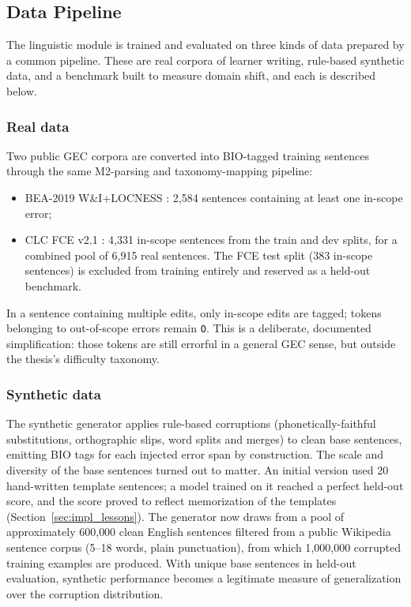 \subsection{Data Pipeline}
\label{sec:impl_ling_data}

The linguistic module is trained and evaluated on three kinds of data prepared by a common pipeline. These are real corpora of learner writing, rule-based synthetic data, and a benchmark built to measure domain shift, and each is described below.

\subsubsection{Real data}

Two public GEC corpora are converted into BIO-tagged training sentences through the same M2-parsing and taxonomy-mapping pipeline:

\begin{itemize}
    \item BEA-2019 W\&I+LOCNESS \parencite{Bryant2019}: 2{,}584 sentences containing at least one in-scope error;
    \item CLC FCE v2.1 \parencite{YannakoudakisBriscoeMedlock2011}: 4{,}331 in-scope sentences from the train and dev splits, for a combined pool of 6{,}915 real sentences. The FCE test split (383 in-scope sentences) is excluded from training entirely and reserved as a held-out benchmark.
\end{itemize}

In a sentence containing multiple edits, only in-scope edits are tagged; tokens belonging to out-of-scope errors remain \texttt{O}. This is a deliberate, documented simplification: those tokens are still errorful in a general GEC sense, but outside the thesis's difficulty taxonomy.

\subsubsection{Synthetic data}

The synthetic generator applies rule-based corruptions (phonetically-faithful substitutions, orthographic slips, word splits and merges) to clean base sentences, emitting BIO tags for each injected error span by construction. The scale and diversity of the base sentences turned out to matter. An initial version used 20 hand-written template sentences; a model trained on it reached a perfect held-out score, and the score proved to reflect memorization of the templates (Section~\ref{sec:impl_lessons}). The generator now draws from a pool of approximately 600{,}000 clean English sentences filtered from a public Wikipedia sentence corpus (5--18 words, plain punctuation), from which 1{,}000{,}000 corrupted training examples are produced. With unique base sentences in held-out evaluation, synthetic performance becomes a legitimate measure of generalization over the corruption distribution.

